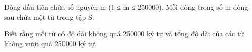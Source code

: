 Dòng đầu tiên chứa số nguyên m (1 ≤ m ≤ 250000). Mỗi dòng trong số m dòng sau chứa một từ trong tập S.  

   Biết rằng mỗi từ có độ dài không quá 250000 ký tự và tổng độ dài của các từ không vượt quá 250000 ký tự.  

\